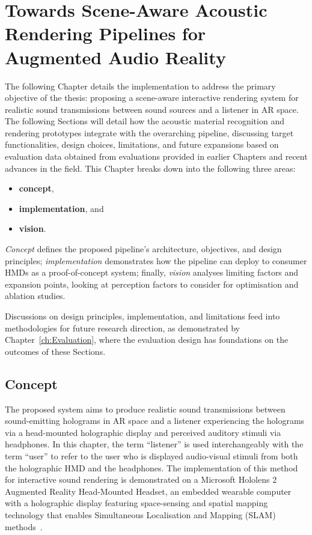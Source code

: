 \chapter{Towards Scene-Aware Acoustic Rendering Pipelines for Augmented Audio Reality}\label{ch:ar-pipeline}%
The following Chapter details the implementation to address the primary objective of the thesis: proposing a scene-aware interactive rendering system for realistic sound transmissions between sound sources and a listener in AR space. The following Sections will detail how the acoustic material recognition and rendering prototypes integrate with the overarching pipeline, discussing target functionalities, design choices, limitations, and future expansions based on evaluation data obtained from evaluations provided in earlier Chapters and recent advances in the field. This Chapter breaks down into the following three areas:
\begin{itemize}
    \item \textbf{concept},
    \item \textbf{implementation}, and
    \item \textbf{vision}.
\end{itemize}
\emph{Concept} defines the proposed pipeline's architecture, objectives, and design principles; \emph{implementation} demonstrates how the pipeline can deploy to consumer HMDs as a proof-of-concept system; finally, \emph{vision} analyses limiting factors and expansion points, looking at perception factors to consider for optimisation and ablation studies.\par
Discussions on design principles, implementation, and limitations feed into methodologies for future research direction, as demonstrated by Chapter~\ref{ch:Evaluation}, where the evaluation design has foundations on the outcomes of these Sections.

\section{Concept}\label{sec:overview}
The proposed system aims to produce realistic sound transmissions between sound-emitting holograms in AR space and a listener experiencing the holograms via a head-mounted holographic display and perceived auditory stimuli via headphones. In this chapter, the term ``listener'' is used interchangeably with the term ``user'' to refer to the user who is displayed audio-visual stimuli from both the holographic HMD and the headphones. The implementation of this method for interactive sound rendering is demonstrated on a Microsoft Hololens 2 Augmented Reality Head-Mounted Headset, an embedded wearable computer with a holographic display featuring space-sensing and spatial mapping technology that enables Simultaneous Localisation and Mapping (SLAM) methods~\cite{davison2003real, ungureanu2020hololens}.\par


